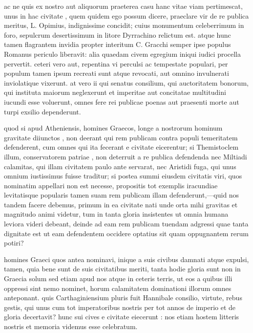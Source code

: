  ac ne quis ex nostro aut aliquorum praeterea casu hanc vitae viam pertimescat, unus in hac civitate , quem quidem ego possum dicere, praeclare vir de re publica meritus, L. Opimius, indignissime concidit; cuius monumentum celeberrimum in foro, sepulcrum desertissimum in litore Dyrrachino relictum est. atque hunc tamen flagrantem invidia propter interitum C. Gracchi semper ipse populus Romanus periculo liberavit: alia quaedam civem egregium iniqui iudici procella pervertit. ceteri vero aut, repentina vi perculsi ac tempestate populari, per populum tamen ipsum recreati sunt atque revocati, aut omnino invulnerati inviolatique vixerunt. at vero ii qui senatus consilium, qui auctoritatem bonorum, qui instituta maiorum neglexerunt et imperitae aut concitatae multitudini iucundi esse voluerunt, omnes fere rei publicae poenas aut praesenti morte aut turpi exsilio dependerunt.

 quod si apud Atheniensis, homines Graecos, longe a nostrorum hominum gravitate diiunctos , non deerant qui rem publicam contra populi temeritatem defenderent, cum omnes qui ita fecerant e civitate eicerentur; si Themistoclem illum, conservatorem patriae , non deterruit a re publica defendenda nec Miltiadi calamitas, qui illam civitatem paulo ante servarat, nec Aristidi fuga, qui unus omnium iustissimus fuisse traditur; si postea summi eiusdem civitatis viri, quos nominatim appellari non est necesse, propositis tot exemplis iracundiae levitatisque popularis tamen suam rem publicam illam defenderunt,—quid nos tandem facere debemus, primum in ea civitate nati unde orta mihi gravitas et magnitudo animi videtur, tum in tanta gloria insistentes ut omnia humana leviora videri debeant, deinde ad eam rem publicam tuendam adgressi quae tanta dignitate est ut eam defendentem occidere optatius sit quam oppugnantem rerum potiri?

 homines Graeci quos antea nominavi, inique a suis civibus damnati atque expulsi, tamen, quia bene sunt de suis civitatibus meriti, tanta hodie gloria sunt non in Graecia solum sed etiam apud nos atque in ceteris terris, ut eos a quibus illi oppressi sint nemo nominet, horum calamitatem dominationi illorum omnes anteponant. quis Carthaginiensium pluris fuit Hannibale consilio, virtute, rebus gestis, qui unus cum tot imperatoribus nostris per tot annos de imperio et de gloria decertavit? hunc sui cives e civitate eiecerunt : nos etiam hostem litteris nostris et memoria videmus esse celebratum.

